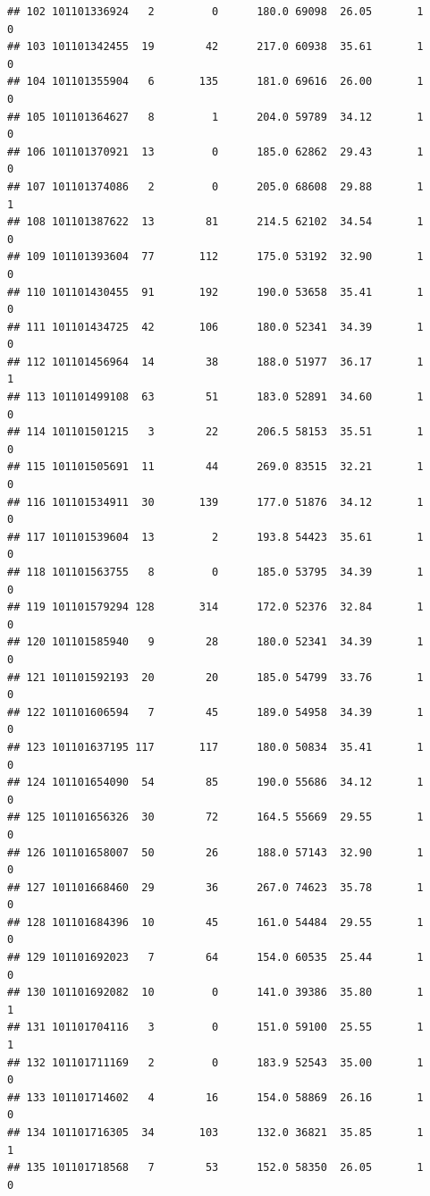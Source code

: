 \documentclass[
]{article}
\begin{document}
\begin{verbatim}
## 102 101101336924   2         0      180.0 69098  26.05       1          0
## 103 101101342455  19        42      217.0 60938  35.61       1          0
## 104 101101355904   6       135      181.0 69616  26.00       1          0
## 105 101101364627   8         1      204.0 59789  34.12       1          0
## 106 101101370921  13         0      185.0 62862  29.43       1          0
## 107 101101374086   2         0      205.0 68608  29.88       1          1
## 108 101101387622  13        81      214.5 62102  34.54       1          0
## 109 101101393604  77       112      175.0 53192  32.90       1          0
## 110 101101430455  91       192      190.0 53658  35.41       1          0
## 111 101101434725  42       106      180.0 52341  34.39       1          0
## 112 101101456964  14        38      188.0 51977  36.17       1          1
## 113 101101499108  63        51      183.0 52891  34.60       1          0
## 114 101101501215   3        22      206.5 58153  35.51       1          0
## 115 101101505691  11        44      269.0 83515  32.21       1          0
## 116 101101534911  30       139      177.0 51876  34.12       1          0
## 117 101101539604  13         2      193.8 54423  35.61       1          0
## 118 101101563755   8         0      185.0 53795  34.39       1          0
## 119 101101579294 128       314      172.0 52376  32.84       1          0
## 120 101101585940   9        28      180.0 52341  34.39       1          0
## 121 101101592193  20        20      185.0 54799  33.76       1          0
## 122 101101606594   7        45      189.0 54958  34.39       1          0
## 123 101101637195 117       117      180.0 50834  35.41       1          0
## 124 101101654090  54        85      190.0 55686  34.12       1          0
## 125 101101656326  30        72      164.5 55669  29.55       1          0
## 126 101101658007  50        26      188.0 57143  32.90       1          0
## 127 101101668460  29        36      267.0 74623  35.78       1          0
## 128 101101684396  10        45      161.0 54484  29.55       1          0
## 129 101101692023   7        64      154.0 60535  25.44       1          0
## 130 101101692082  10         0      141.0 39386  35.80       1          1
## 131 101101704116   3         0      151.0 59100  25.55       1          1
## 132 101101711169   2         0      183.9 52543  35.00       1          0
## 133 101101714602   4        16      154.0 58869  26.16       1          0
## 134 101101716305  34       103      132.0 36821  35.85       1          1
## 135 101101718568   7        53      152.0 58350  26.05       1          0

\end{verbatim}
\end{document}
